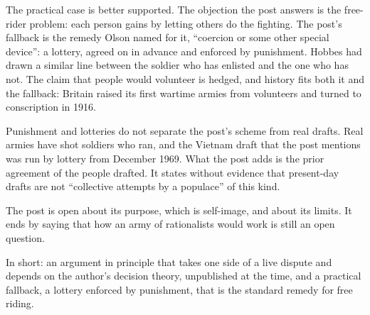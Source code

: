 \begin{afterword}
The practical case is better supported. The objection the post answers is the free-rider problem: each person gains by letting others do the fighting. The post's fallback is the remedy Olson named for it, ``coercion or some other special device'': a lottery, agreed on in advance and enforced by punishment. Hobbes had drawn a similar line between the soldier who has enlisted and the one who has not. The claim that people would volunteer is hedged, and history fits both it and the fallback: Britain raised its first wartime armies from volunteers and turned to conscription in 1916.

Punishment and lotteries do not separate the post's scheme from real drafts. Real armies have shot soldiers who ran, and the Vietnam draft that the post mentions was run by lottery from December 1969. What the post adds is the prior agreement of the people drafted. It states without evidence that present-day drafts are not ``collective attempts by a populace'' of this kind.

The post is open about its purpose, which is self-image, and about its limits. It ends by saying that how an army of rationalists would work is still an open question.

In short: an argument in principle that takes one side of a live dispute and depends on the author's decision theory, unpublished at the time, and a practical fallback, a lottery enforced by punishment, that is the standard remedy for free riding.
\end{afterword}
